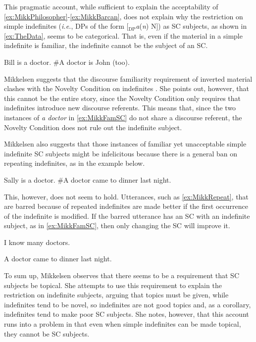 \documentclass[
	letterpaper,
]{article}
\begin{document}
This pragmatic account, while sufficient to explain the acceptability of \ref{ex:MikkPhilosopher}-\ref{ex:MikkBarcan}, does not explain why the restriction on simple indefinites (\textit{i.e.}, DPs of the form [$_\text{DP}$\textit{a}(\textit{n}) N]) as SC subjects, as shown in \ref{ex:TheData}, seems to be categorical.
That is, even if the material in a simple indefinite is familiar, the indefinite cannot be the subject of an SC.
\begin{exe}
	\ex\label{ex:MikkFamSC} Bill is a doctor. \#A doctor is John (too).
\end{exe}
Mikkelsen suggests that the discourse familiarity requirement of inverted material clashes with the Novelty Condition on indefinites \parencite{heim1982semantics}.
She points out, however, that this cannot be the entire story, since the Novelty Condition only requires that indefinites introduce new discourse referents.
This means that, since the two instances of \textit{a doctor} in \ref{ex:MikkFamSC} do not share a discourse referent, the Novelty Condition does not rule out the indefinite subject.

Mikkelsen also suggests that those instances of familiar yet unacceptable simple indefinite SC subjects might be infelicitous because there is a general ban on repeating indefinites, as in the example below.
\begin{exe}
	\ex\label{ex:MikkRepeat} Sally is a doctor. \#A doctor came to dinner last night.
\end{exe}
This, however, does not seem to hold.
Utterances, such as \ref{ex:MikkRepeat}, that are barred because of repeated indefinites are made better if the first occurrence of the indefinite is modified.
If the barred utterance has an SC with an indefinite subject, as in \ref{ex:MikkFamSC}, then only changing the SC will improve it.
\begin{exe}
\ex\label{ex:IndefGiven} I know many doctors.
\begin{xlist}
	\ex A doctor came to dinner last night.
\end{xlist}
\end{exe}
To sum up, Mikkelsen observes that there seems to be a requirement that SC subjects be topical.
She attempts to use this requirement to explain the restriction on indefinite subjects, arguing that topics must be given, while indefinites tend to be novel, so indefinites are not good topics and, as a corollary, indefinites tend to make poor SC subjects.
She notes, however, that this account runs into a problem in that even when simple indefinites can be made topical, they cannot be SC subjects.
\end{document}
